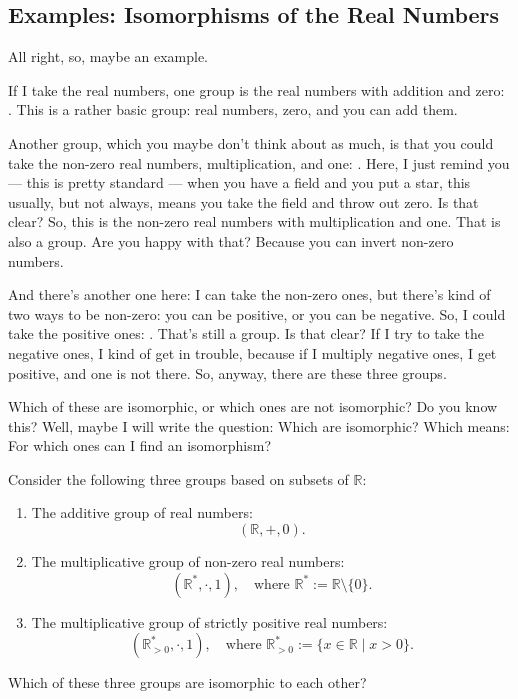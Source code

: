 \subsection{Examples: Isomorphisms of the Real Numbers}

\begin{speech}[00:12:43 - 00:14:43]
All right, so, maybe an example.

If I take the real numbers, one group is the real numbers with addition and zero: . This is a rather basic group: real numbers, zero, and you can add them.

Another group, which you maybe don't think about as much, is that you could take the non-zero real numbers, multiplication, and one: . Here, I just remind you --- this is pretty standard --- when you have a field and you put a star,  this usually, but not always, means you take the field and throw out zero. Is that clear? So, this is the non-zero real numbers with multiplication and one. That is also a group. Are you happy with that? Because you can invert non-zero numbers.

And there's another one here: I can take the non-zero ones, but there's kind of two ways to be non-zero: you can be positive, or you can be negative. So, I could take the positive ones: . That's still a group. Is that clear? If I try to take the negative ones, I kind of get in trouble, because if I multiply negative ones, I get positive, and one is not there. So, anyway, there are these three groups.

Which of these are isomorphic, or which ones are not isomorphic? Do you know this? Well, maybe I will write the question: Which are isomorphic?  Which means: For which ones can I find an isomorphism?
\end{speech}

\begin{content}
Consider the following three groups based on subsets of $\mathbb{R}$:
\begin{enumerate}[label=\textbf{(\arabic*)}]
    \item The additive group of real numbers:
    \[
    (\mathbb{R}, +, 0).
    \]
    \item The multiplicative group of non-zero real numbers:
    \[
    (\mathbb{R}^*, \cdot, 1), \quad \text{where } \mathbb{R}^* := \mathbb{R} \setminus \{0\}.
    \]
    \item The multiplicative group of strictly positive real numbers:
    \[
    (\mathbb{R}^*_{>0}, \cdot, 1), \quad \text{where } \mathbb{R}^*_{>0} := \{ x \in \mathbb{R} \mid x > 0 \}.
    \]
\end{enumerate}

\begin{question}
Which of these three groups are isomorphic to each other?
\end{question}
\end{content}

